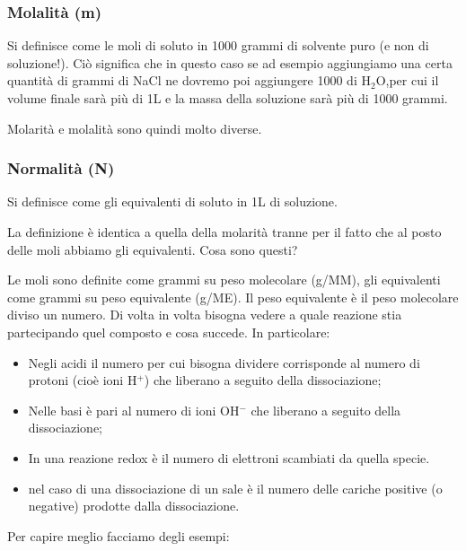 \subsubsection{Molalità (m)}
Si definisce come le moli di soluto in 1000 grammi di solvente puro (e non di soluzione!). Ciò significa che in questo caso se ad esempio aggiungiamo una certa quantità di grammi di NaCl ne dovremo poi aggiungere 1000 di H$_2$O,per cui il volume finale sarà più di 1L e la massa della soluzione sarà più di 1000 grammi.

Molarità e molalità sono quindi molto diverse.
\subsubsection{Normalità (N)}
Si definisce come gli equivalenti di soluto in 1L di soluzione.

La definizione è identica a quella della molarità tranne per il fatto che al posto delle moli abbiamo gli equivalenti. Cosa sono questi?

Le moli sono definite come grammi su peso molecolare (g/MM), gli equivalenti come grammi su peso equivalente (g/ME). Il peso equivalente è il peso molecolare diviso un numero. Di volta in volta bisogna vedere a quale reazione stia partecipando quel composto e cosa succede. In particolare:
\begin{itemize}
    \item Negli acidi il numero per cui bisogna dividere corrisponde al numero di protoni (cioè ioni H$^+$) che liberano a seguito della dissociazione;
    \item Nelle basi è pari al numero di ioni OH$^-$ che liberano a seguito della dissociazione;
    \item In una reazione redox è il numero di elettroni scambiati da quella specie.
    \item nel caso di una dissociazione di un sale è il numero delle cariche positive (o negative) prodotte dalla dissociazione.
\end{itemize}

Per capire meglio facciamo degli esempi:

